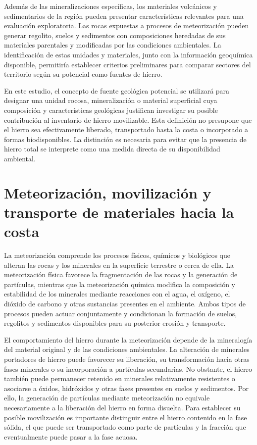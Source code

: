 Además de las mineralizaciones específicas, los materiales volcánicos y sedimentarios de la región pueden presentar características relevantes para una evaluación exploratoria. Las rocas expuestas a procesos de meteorización pueden generar regolito, suelos y sedimentos con composiciones heredadas de sus materiales parentales y modificadas por las condiciones ambientales. La identificación de estas unidades y materiales, junto con la información geoquímica disponible, permitiría establecer criterios preliminares para comparar sectores del territorio según su potencial como fuentes de hierro.

En este estudio, el concepto de fuente geológica potencial se utilizará para designar una unidad rocosa, mineralización o material superficial cuya composición y características geológicas justifican investigar su posible contribución al inventario de hierro movilizable. Esta definición no presupone que el hierro sea efectivamente liberado, transportado hasta la costa o incorporado a formas biodisponibles. La distinción es necesaria para evitar que la presencia de hierro total se interprete como una medida directa de su disponibilidad ambiental.

\section{Meteorización, movilización y transporte de materiales hacia la costa}

La meteorización comprende los procesos físicos, químicos y biológicos que alteran las rocas y los minerales en la superficie terrestre o cerca de ella. La meteorización física favorece la fragmentación de las rocas y la generación de partículas, mientras que la meteorización química modifica la composición y estabilidad de los minerales mediante reacciones con el agua, el oxígeno, el dióxido de carbono y otras sustancias presentes en el ambiente. Ambos tipos de procesos pueden actuar conjuntamente y condicionan la formación de suelos, regolitos y sedimentos disponibles para su posterior erosión y transporte.

El comportamiento del hierro durante la meteorización depende de la mineralogía del material original y de las condiciones ambientales. La alteración de minerales portadores de hierro puede favorecer su liberación, su transformación hacia otras fases minerales o su incorporación a partículas secundarias. No obstante, el hierro también puede permanecer retenido en minerales relativamente resistentes o asociarse a óxidos, hidróxidos y otras fases presentes en suelos y sedimentos. Por ello, la generación de partículas mediante meteorización no equivale necesariamente a la liberación del hierro en forma disuelta. Para establecer su posible movilización es importante distinguir entre el hierro contenido en la fase sólida, el que puede ser transportado como parte de partículas y la fracción que eventualmente puede pasar a la fase acuosa.

